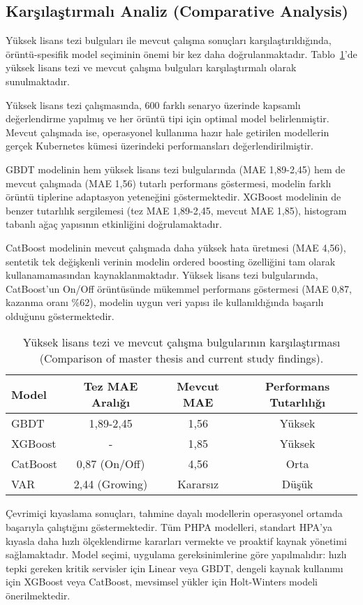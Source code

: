 \subsection{Karşılaştırmalı Analiz (Comparative Analysis)}

Yüksek lisans tezi bulguları ile mevcut çalışma sonuçları karşılaştırıldığında, örüntü-spesifik model seçiminin önemi bir kez daha doğrulanmaktadır. Tablo~\ref{tab:comparative}'de yüksek lisans tezi ve mevcut çalışma bulguları karşılaştırmalı olarak sunulmaktadır.

Yüksek lisans tezi çalışmasında, 600 farklı senaryo üzerinde kapsamlı değerlendirme yapılmış ve her örüntü tipi için optimal model belirlenmiştir. Mevcut çalışmada ise, operasyonel kullanıma hazır hale getirilen modellerin gerçek Kubernetes kümesi üzerindeki performansları değerlendirilmiştir.

GBDT modelinin hem yüksek lisans tezi bulgularında (MAE 1,89-2,45) hem de mevcut çalışmada (MAE 1,56) tutarlı performans göstermesi, modelin farklı örüntü tiplerine adaptasyon yeteneğini göstermektedir. XGBoost modelinin de benzer tutarlılık sergilemesi (tez MAE 1,89-2,45, mevcut MAE 1,85), histogram tabanlı ağaç yapısının etkinliğini doğrulamaktadır.

CatBoost modelinin mevcut çalışmada daha yüksek hata üretmesi (MAE 4,56), sentetik tek değişkenli verinin modelin ordered boosting özelliğini tam olarak kullanamamasından kaynaklanmaktadır. Yüksek lisans tezi bulgularında, CatBoost'un On/Off örüntüsünde mükemmel performans göstermesi (MAE 0,87, kazanma oranı \%62), modelin uygun veri yapısı ile kullanıldığında başarılı olduğunu göstermektedir.

\begin{table}[h]
    \centering
    \caption{Yüksek lisans tezi ve mevcut çalışma bulgularının karşılaştırması (Comparison of master thesis and current study findings).}
    \label{tab:comparative}
    \begin{tabular}{@{}lccc@{}}
        \toprule
        Model & Tez MAE Aralığı & Mevcut MAE & Performans Tutarlılığı \\
        \midrule
        GBDT & 1,89-2,45 & 1,56 & Yüksek \\
        XGBoost & - & 1,85 & Yüksek \\
        CatBoost & 0,87 (On/Off) & 4,56 & Orta \\
        VAR & 2,44 (Growing) & Kararsız & Düşük \\
        \bottomrule
    \end{tabular}
\end{table}

Çevrimiçi kıyaslama sonuçları, tahmine dayalı modellerin operasyonel ortamda başarıyla çalıştığını göstermektedir. Tüm PHPA modelleri, standart HPA'ya kıyasla daha hızlı ölçeklendirme kararları vermekte ve proaktif kaynak yönetimi sağlamaktadır. Model seçimi, uygulama gereksinimlerine göre yapılmalıdır: hızlı tepki gereken kritik servisler için Linear veya GBDT, dengeli kaynak kullanımı için XGBoost veya CatBoost, mevsimsel yükler için Holt-Winters modeli önerilmektedir.
